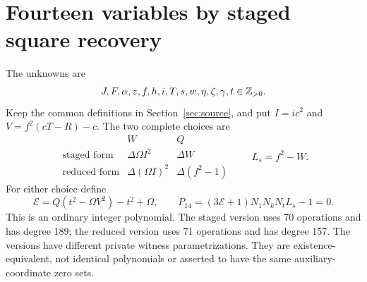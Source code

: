 \section{Fourteen variables by staged square recovery}
\label{sec:fourteen}

The unknowns are
\[
J,F,\alpha,z,f,h,i,T,s,w,\eta,\zeta,\gamma,t\in\mathbb Z_{>0}.
\]
Keep the common definitions in Section~\ref{sec:source}, and put
$I=ic^2$ and $V=f^2(cT-R)-c$. The two complete choices are
\[
\begin{array}{c|cc}
 & W & Q\\\hline
\text{staged form} & \Delta\Omega I^2 & \Delta W\\
\text{reduced form} & \Delta(\Omega I)^2 & \Delta(f^2-1)
\end{array}
\qquad L_s=f^2-W.
\]
For either choice define
\[
\mathcal E=Q(t^2-\Omega V^2)-t^2+\Omega,
\qquad
\boxed{P_{14}=(3\mathcal E+1)N_1N_kN_tL_s-1=0.}
\]
This is an ordinary integer polynomial. The staged version uses 70 operations
and has degree 189; the reduced version uses 71 operations and has degree 157.
The versions have different private witness parametrizations. They are
existence-equivalent, not identical polynomials or asserted to have the same
auxiliary-coordinate zero sets.

